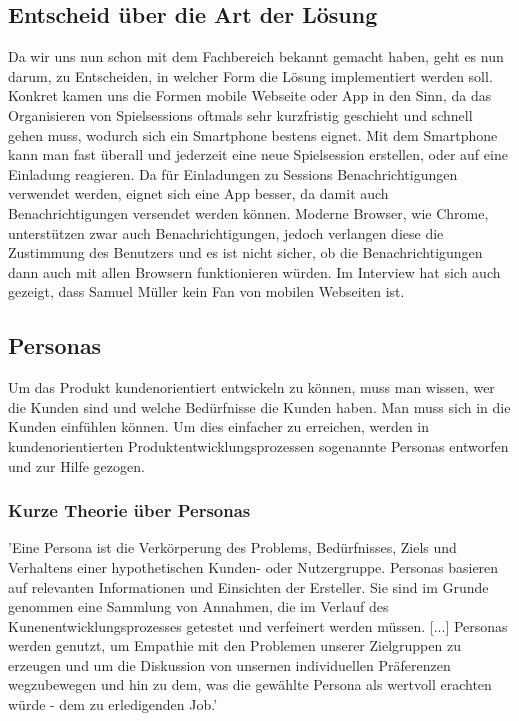 \subsection{Entscheid über die Art der Lösung}
Da wir uns nun schon mit dem Fachbereich bekannt gemacht haben, geht es nun darum, zu Entscheiden, in welcher Form die Lösung implementiert werden soll. Konkret kamen uns die Formen mobile Webseite oder App in den Sinn, da das Organisieren von Spielsessions oftmals sehr kurzfristig geschieht und schnell gehen muss, wodurch sich ein Smartphone bestens eignet. Mit dem Smartphone kann man fast überall und jederzeit eine neue Spielsession erstellen, oder auf eine Einladung reagieren. Da für Einladungen zu Sessions Benachrichtigungen verwendet werden, eignet sich eine 
App besser, da damit auch Benachrichtigungen versendet werden können. Moderne Browser, wie Chrome, unterstützen zwar auch Benachrichtigungen, jedoch verlangen diese die Zustimmung des Benutzers und es ist nicht sicher, ob die Benachrichtigungen dann auch mit allen Browsern funktionieren würden. Im Interview hat sich auch gezeigt, dass Samuel Müller kein Fan von mobilen Webseiten ist.

\subsection{Personas}
Um das Produkt kundenorientiert entwickeln zu können, muss man wissen, wer die Kunden sind und welche Bedürfnisse die Kunden haben. Man muss sich in die Kunden einfühlen können. Um dies einfacher zu erreichen, werden in kundenorientierten Produktentwicklungsprozessen sogenannte Personas entworfen und zur Hilfe gezogen.
\subsubsection{Kurze Theorie über Personas}
'Eine Persona ist die Verkörperung des Problems, Bedürfnisses, Ziels und Verhaltens einer hypothetischen Kunden- oder Nutzergruppe. Personas basieren auf relevanten Informationen und Einsichten der Ersteller. Sie sind im Grunde genommen eine Sammlung von Annahmen, die  im Verlauf des Kunenentwicklungsprozesses getestet und verfeinert werden müssen. [...] Personas werden genutzt, um Empathie mit den Problemen unserer Zielgruppen zu erzeugen und um die Diskussion von unsernen individuellen Präferenzen wegzubewegen und hin zu dem, was die gewählte Persona als wertvoll erachten würde - dem zu erledigenden Job.' \cite{humble2017lean}
